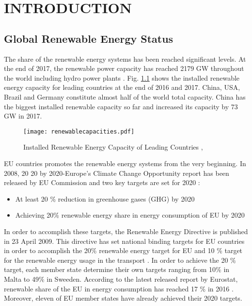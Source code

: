 \chapter{INTRODUCTION}
\label{chp:1}
\section{Global Renewable Energy Status}
The share of the renewable energy systems has been reached significant levels. At the end of 2017, the renewable power capacity has reached 2179 GW throughout the world including hydro power plants \cite{InternationalRenewableEnergyAgencyIRENA2018}. Fig. \ref{renewablecap} shows the installed renewable energy capacity for leading countries at the end of 2016 and 2017. China, USA, Brazil and Germany constitute almost half of the world total capacity. China has the biggest installed renewable capacity so far and increased its capacity by 73 GW in 2017.\par
\begin{figure}[h]
	\centering
	\texttt{[image: renewablecapacities.pdf]}
	\caption{Installed Renewable Energy Capacity of Leading Countries \cite{InternationalRenewableEnergyAgencyIRENA2018},\cite{InternationalRenewableEnergyAgency2017}}
	\label{renewablecap}
\end{figure}
EU countries promotes the renewable energy systems from the very beginning. In 2008, 20 20 by 2020-Europe's Climate Change Opportunity report has been released by EU Commission and two key targets are set for 2020 \cite{EuropeanCommission2008}: 
\begin{itemize}  
	\item At least 20 \% reduction in greenhouse gases (GHG) by 2020
	\item Achieving 20\% renewable energy share in energy consumption of EU by 2020
\end{itemize}
In order to accomplish these targets, the Renewable Energy Directive is published in 23 April 2009. This directive has set national binding targets for EU countries in order to accomplish the 20\% renewable energy target for EU and 10 \% target for the renewable energy usage in the transport \cite{EuropeanParliament2009}. In order to achieve the 20 \% target, each member state determine their own targets ranging from 10\% in Malta to 49\% in Sweeden. According to the latest released report by Eurostat, renewable share of the EU in energy consumption has reached 17 \% in 2016 \cite{States2016}. Moreover, eleven of EU member states have already achieved their 2020 targets.\par
